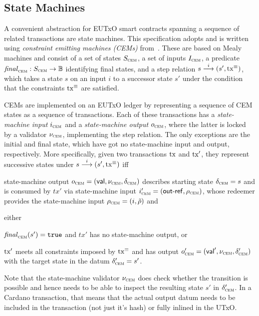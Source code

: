 \subsection{State Machines}\label{sec:cem}

A convenient abstraction for EUTxO smart contracts spanning a sequence of
related transactions are state machines. This specification adopts and is
written using \emph{constraint emitting machines (CEMs)} from~\cite{eutxo}.
These are based on Mealy machines and consist of a set of states $S_{\textsc{cem}}$, a set
of inputs $I_{\textsc{cem}}$, a predicate \(\mathit{final}_{\textsc{cem}} : S_{\textsc{cem}}\to\mathbb{B}\) identifying final
states, and a step relation \({s}\overset{i}\longrightarrow(s', \mathrm{tx}^\equiv)\), which takes a
state $s$ on an input $i$ to a successor state $s'$ under the condition that the
constraints $\mathrm{tx}^\equiv$ are satisfied.

CEMs are implemented on an EUTxO ledger by representing a sequence of CEM states
as a sequence of transactions. Each of these transactions has a
\emph{state-machine input} $i_{\textsc{cem}}$ and a \emph{state-machine output} $o_{\textsc{cem}}$,
where the latter is locked by a validator $\nu_{\textsc{cem}}$, implementing the step
relation. The only exceptions are the initial and final state, which have got no
state-machine input and output, respectively. More specifically, given two
transactions $\mathrm{tx}$ and $\mathrm{tx}'$, they represent successive states under
\({s}\overset{i}\longrightarrow(s', \mathrm{tx}^\equiv)\) iff

\begin{mitemize}
  \item state-machine output $o_{\textsc{cem}} = (\mathsf{val}, \nu_{\textsc{cem}}, \delta_{\textsc{cem}})$
  describes starting state $\delta_{\textsc{cem}} = s$ and is consumed by $tx'$ via
  state-machine input $i_{\textsc{cem}}' = (\mathsf{out\textsf{-}{}ref}, \rho_{\textsc{cem}})$, whose redeemer
  provides the state-machine input $\rho_{\textsc{cem}} = (i, \tilde{\rho})$ and
  \item either
    \begin{mitemize}
      \item $\mathit{final}_{\textsc{cem}}(s') = \mathtt{true}$ and $tx'$ has no state-machine output, or
      \item $\mathrm{tx}'$ meets all constraints imposed by $\mathrm{tx}^\equiv$ and has output
      $o_{\textsc{cem}}' = (\mathsf{val}', \nu_{\textsc{cem}}, \delta_{\textsc{cem}}')$ with the target state in
      the datum $\delta_{\textsc{cem}}' = s'$.
    \end{mitemize}
\end{mitemize}

Note that the state-machine validator $\nu_{\textsc{cem}}$ does check whether the
transition is possible and hence needs to be able to inspect the resulting state
$s'$ in $\delta_{\textsc{cem}}'$. In a Cardano transaction, that means that the actual output
datum needs to be included in the transaction (not just it's hash) or fully inlined
in the UTxO.

